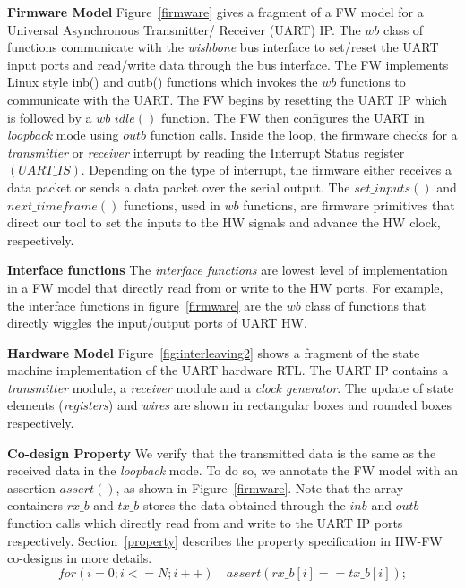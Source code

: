 \documentclass[sigconf]{acmart}
\begin{document}
\textbf{Firmware Model} Figure~\ref{firmware} gives a fragment of a FW model for a Universal 
Asynchronous Transmitter/ Receiver (UART) IP.  The
$wb$ class of functions communicate with the {\em wishbone} bus interface to
set/reset the UART input ports and read/write data through the bus
interface.  The FW implements Linux style inb() and outb() functions which
invokes the $wb$ functions to communicate with the UART.  The FW begins 
by resetting the UART IP which is followed by a $wb\_idle()$ function.  The 
FW then configures the UART in {\em loopback} mode using $outb$ function calls. 
Inside the loop, the firmware checks for a {\em transmitter} or {\em
receiver} interrupt by reading the Interrupt Status register $(UART\_IS)$. 
Depending on the type of interrupt, the firmware either receives a data packet 
or sends a data packet over the serial output.  The $set\_inputs()$ and
$next\_timeframe()$ functions, used in $wb$ functions, are 
firmware primitives that direct our tool to set the inputs to the HW signals 
and advance the HW clock, respectively.

\textbf{Interface functions} The \emph{interface functions} are lowest level of 
implementation in a FW model that directly read from or write to the HW ports. 
For example, the interface functions in figure~\ref{firmware} are the $wb$ class
of functions that directly wiggles the input/output ports of UART HW.


\textbf{Hardware Model} Figure~\ref{fig:interleaving2} shows a fragment of the state machine 
implementation of the UART hardware RTL.  The UART IP contains a
\emph{transmitter} module, a \emph{receiver} module and a \emph{clock
generator}.  The update of state elements (\emph{registers}) and 
\emph{wires} are shown in rectangular boxes and rounded boxes respectively.  

\textbf{Co-design Property} We verify that the transmitted data is the same as the 
received data in the {\em loopback} mode.  To do so, we annotate the FW model 
with an assertion $assert()$, as shown in Figure~\ref{firmware}.  Note that the 
array containers $rx\_b$ and $tx\_b$ stores the data obtained through the $inb$
and $outb$ function calls which directly read from and write to the UART IP ports
respectively. Section~\ref{property} describes the property specification in
HW-FW co-designs in more details. 
\[
  for(i=0; i<=N; i++) 
   \quad assert(rx\_b[i] == tx\_b[i]);
\]
%
\end{document}
